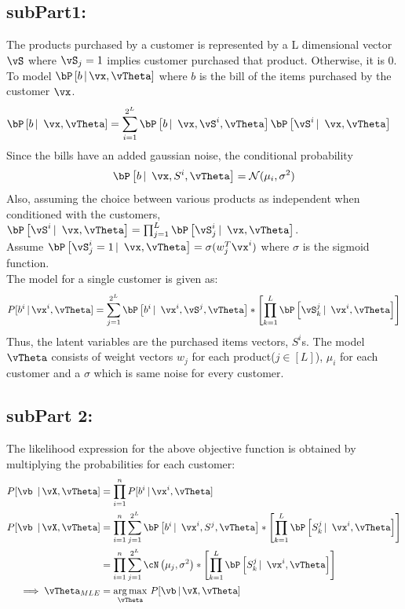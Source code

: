\documentclass[a4paper,11pt]{article}
\begin{document}
\begin{mlsolution}
	\subsection{subPart1:}
	The products purchased by a customer is represented by a L dimensional vector $\vS$ where $\vS_j = 1$ implies customer purchased that product. Otherwise, it is 0.
	To model $\P{b\cond\vx,\vTheta}$ where $b$ is the bill of the items purchased by the customer $\vx$.
	\begin{align*}
		\P{b\cond\ \vx, \vTheta} &= \sum_{i=1}^{2^L} \P{b\cond\ \vx, \vS^i, \vTheta} \P{\vS^i\cond\ \vx, \vTheta}
	\end{align*}
	Since the bills have an added gaussian noise, the conditional probability $$\P{b\cond\ \vx, S^i, \vTheta} = \mathcal{N}(\mu_i, \sigma^2)$$
	Also, assuming the choice between various products as independent when conditioned with the customers, $\P{\vS^i\cond\ \vx, \vTheta} = \prod_{j=1}^{L} \P{\vS^i_j\cond\ \vx, \vTheta}$.\\
	Assume $\P{\vS^i_j=1\cond\ \vx, \vTheta} = \sigma(w_j^T\vx^i)$ where $\sigma$ is the sigmoid function.\\
	The model for a single customer is given as:
	$$P[b^i \cond \vx^i, \vTheta] = \sum_{j=1}^{2^L} \P{b^i\cond\ \vx^i, \vS^j, \vTheta} * \left[\prod_{k=1}^{L} \P{\vS^j_k\cond\ \vx^i, \vTheta}\right]$$
	Thus, the latent variables are the purchased items vectors, $S^i$s.
	The model $\vTheta$ consists of weight vectors $w_j$ for each product($j \in [L]$),  $\mu_i$ for each customer and a $\sigma$ which is same noise for every customer.
	
	\subsection{subPart 2:}
	The likelihood expression for the above objective function is obtained by multiplying the probabilities for each customer:
	\begin{align*}
	P[\vb\ \cond \vX, \vTheta] &= \prod_{i=1}^{n} P[b^i \cond \vx^i, \vTheta]\\
	P[\vb\ \cond \vX, \vTheta] &= \prod_{i=1}^{n}\sum_{j=1}^{2^L} \P{b^i\cond\ \vx^i, S^j, \vTheta} * \left[\prod_{k=1}^{L} \P{S^j_k\cond\ \vx^i, \vTheta}\right]\\
	&= \prod_{i=1}^{n}\sum_{j=1}^{2^L} \cN\left(\mu_j,\sigma^2\right) * \left[\prod_{k=1}^{L} \P{S^j_k\cond\ \vx^i, \vTheta}\right]	\\
	\implies \vTheta_{MLE}& = \underset{\vTheta}{\arg\max}\ P[\vb\cond \vX, \vTheta]
	\end{align*}
	

\end{mlsolution}
\end{document}
